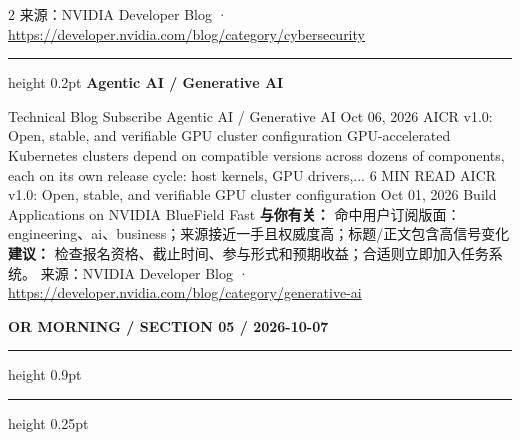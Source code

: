 \documentclass[10.5pt]{ctexart}
\begin{document}
\begin{multicols}{2}
{\footnotesize\color{ormuted} 来源：NVIDIA Developer Blog · \url{https://developer.nvidia.com/blog/category/cybersecurity}}
\vspace{2mm}
\hrule height 0.2pt
\vspace{2mm}
{\large\bfseries Agentic AI / Generative AI}\par
Technical Blog Subscribe Agentic AI / Generative AI Oct 06, 2026 AICR v1.0: Open, stable, and verifiable GPU cluster configuration GPU-accelerated Kubernetes clusters depend on compatible versions across dozens of components, each on its own release cycle: host kernels, GPU drivers,... 6 MIN READ AICR v1.0: Open, stable, and verifiable GPU cluster configuration Oct 01, 2026 Build Applications on NVIDIA BlueField Fast
\textbf{与你有关：} 命中用户订阅版面：engineering、ai、business；来源接近一手且权威度高；标题/正文包含高信号变化
\textbf{建议：} 检查报名资格、截止时间、参与形式和预期收益；合适则立即加入任务系统。
{\footnotesize\color{ormuted} 来源：NVIDIA Developer Blog · \url{https://developer.nvidia.com/blog/category/generative-ai}}
\end{multicols}
\newpage
{\small\bfseries OR MORNING / SECTION 05 / 2026-10-07}
\vspace{2mm}
\hrule height 0.9pt
\vspace{1.5mm}
\hrule height 0.25pt
\vspace{4mm}
\end{document}
